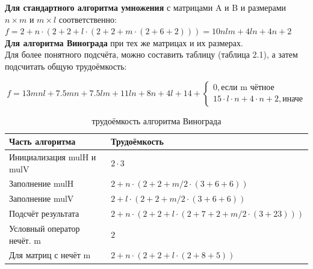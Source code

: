 \documentclass[12pt,a4paper]{report}
\begin{document}
\textbf{Для стандартного алгоритма умножения} с матрицами A и B и размерами $n\times m$ и $m\times l$ 
соответственно: \\

$f = 2 + n \cdot (2 + 2 + l \cdot (2 + 2 + m \cdot (2 + 6 + 2))) = 10nlm + 4ln  + 4n + 2$ \\

\textbf{Для алгоритма Винограда} при тех же матрицах и их размерах. \\

Для более понятного подсчёта, можно составить таблицу (таблица 2.1), а затем подсчитать общую трудоёмкость:

\begin{displaymath}
	f = 13mnl + 7.5mn + 7.5lm + 11ln + 8n + 4l + 14 + \left \{ 
	\begin{array}{ll}  
		0, \textrm{если m чётное} \\ 
		15 \cdot l \cdot n + 4 \cdot n + 2, \textrm{иначе} 
	\end{array} \right.
\end{displaymath}

\begin{table}[h]
	\caption{трудоёмкость алгоритма Винограда}  
	\label{tabular:timesandtenses}
	\begin{center}
		\begin{tabular}{ | l | l | }
			\hline
			Часть алгоритма            & Трудоёмкость                                                        \\ \hline
			Инициализация mulH и mulV  & $2 \cdot 3$                                                         \\ \hline
			Заполнение mulH            & $2 + n \cdot (2 + 2 + m / 2 \cdot (3 + 6 + 6))$                     \\ \hline
			Заполнение mulV            & $2 + l \cdot (2 + 2 + m / 2 \cdot (3 + 6 + 6))$                     \\ \hline
			Подсчёт результата         & $2 + n \cdot (2 + 2 + l \cdot (2 + 7 + 2 + m / 2 \cdot (3 + 23)))$  \\ \hline
			Условный оператор нечёт. m & $2$                                                                 \\ \hline
			Для матриц с нечёт m       & $2 + n \cdot (2 + 2 + l \cdot (2 + 8 + 5))$                         \\ \hline
		\end{tabular}
	\end{center}
\end{table}
\end{document}
